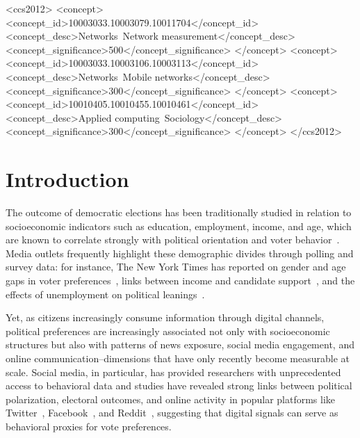 \documentclass[9pt,sigconf,letterpaper]{acmart}
\begin{document}
\begin{CCSXML}
<ccs2012>
   <concept>
       <concept_id>10003033.10003079.10011704</concept_id>
       <concept_desc>Networks~Network measurement</concept_desc>
       <concept_significance>500</concept_significance>
       </concept>
   <concept>
       <concept_id>10003033.10003106.10003113</concept_id>
       <concept_desc>Networks~Mobile networks</concept_desc>
       <concept_significance>300</concept_significance>
       </concept>
   <concept>
       <concept_id>10010405.10010455.10010461</concept_id>
       <concept_desc>Applied computing~Sociology</concept_desc>
       <concept_significance>300</concept_significance>
       </concept>
 </ccs2012>
\end{CCSXML}



\maketitle



\section{Introduction}

The outcome of democratic elections has been traditionally studied in relation to socioeconomic indicators such as education, employment, income, and age, which are known to correlate strongly with political orientation and voter behavior~\cite{lewis2014us, walker2006predicting, galbraith2008state, norpoth2014electoral, stafford2025evaluating, lewis2018candidates}.
Media outlets frequently highlight these demographic divides through polling and survey data: for instance, The New York Times has reported on gender and age gaps in voter preferences~\cite{nyt_election_gender, nyt_election_gender_2}, links between income and candidate support~\cite{nyt_election_income_1}, and the effects of unemployment on political leanings~\cite{nyt_election_unemployment_1}.


Yet, as citizens increasingly consume information through digital channels, political preferences are increasingly associated not only with socioeconomic structures but also with patterns of news exposure, social media engagement, and online communication--dimensions that have only recently become measurable at scale.
Social media, in particular, has provided researchers with unprecedented access to behavioral data and studies have revealed strong links between political polarization, electoral outcomes, and online activity in popular platforms like Twitter~\cite{tumasjan2011election, tsakalidis2015predicting, siegel2021trumping, kruikemeier2014political}, Facebook~\cite{macwilliams2015forecasting}, and Reddit~\cite{richardson2020estimating, cirulli2025polarization, de2021no}, suggesting that digital signals can serve as behavioral proxies for vote preferences.
\end{document}
